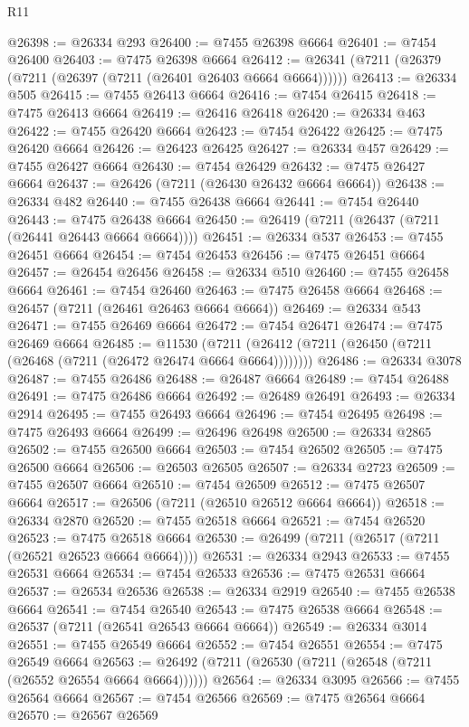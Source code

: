 \begin{lexlean}{R11}
\begin{coremodule}
{{{{{{{{{{{{{{{{{{{{{{{{{{{{{{{{{{{{{{{{{{{{{{{{{{{{{{{{{{{{{{{{{{{{{{{{{{{{{{{{{{@26398 := @26334 @293
@26400 := @7455 @26398 @6664
@26401 := @7454 @26400
@26403 := @7475 @26398 @6664
@26412 := @26341 (@7211 (@26379 (@7211 (@26397 (@7211 (@26401 @26403 @6664 @6664))))))
@26413 := @26334 @505
@26415 := @7455 @26413 @6664
@26416 := @7454 @26415
@26418 := @7475 @26413 @6664
@26419 := @26416 @26418
@26420 := @26334 @463
@26422 := @7455 @26420 @6664
@26423 := @7454 @26422
@26425 := @7475 @26420 @6664
@26426 := @26423 @26425
@26427 := @26334 @457
@26429 := @7455 @26427 @6664
@26430 := @7454 @26429
@26432 := @7475 @26427 @6664
@26437 := @26426 (@7211 (@26430 @26432 @6664 @6664))
@26438 := @26334 @482
@26440 := @7455 @26438 @6664
@26441 := @7454 @26440
@26443 := @7475 @26438 @6664
@26450 := @26419 (@7211 (@26437 (@7211 (@26441 @26443 @6664 @6664))))
@26451 := @26334 @537
@26453 := @7455 @26451 @6664
@26454 := @7454 @26453
@26456 := @7475 @26451 @6664
@26457 := @26454 @26456
@26458 := @26334 @510
@26460 := @7455 @26458 @6664
@26461 := @7454 @26460
@26463 := @7475 @26458 @6664
@26468 := @26457 (@7211 (@26461 @26463 @6664 @6664))
@26469 := @26334 @543
@26471 := @7455 @26469 @6664
@26472 := @7454 @26471
@26474 := @7475 @26469 @6664
@26485 := @11530
    (@7211 (@26412 (@7211 (@26450 (@7211 (@26468 (@7211 (@26472 @26474 @6664 @6664))))))))
@26486 := @26334 @3078
@26487 := @7455 @26486
@26488 := @26487 @6664
@26489 := @7454 @26488
@26491 := @7475 @26486 @6664
@26492 := @26489 @26491
@26493 := @26334 @2914
@26495 := @7455 @26493 @6664
@26496 := @7454 @26495
@26498 := @7475 @26493 @6664
@26499 := @26496 @26498
@26500 := @26334 @2865
@26502 := @7455 @26500 @6664
@26503 := @7454 @26502
@26505 := @7475 @26500 @6664
@26506 := @26503 @26505
@26507 := @26334 @2723
@26509 := @7455 @26507 @6664
@26510 := @7454 @26509
@26512 := @7475 @26507 @6664
@26517 := @26506 (@7211 (@26510 @26512 @6664 @6664))
@26518 := @26334 @2870
@26520 := @7455 @26518 @6664
@26521 := @7454 @26520
@26523 := @7475 @26518 @6664
@26530 := @26499 (@7211 (@26517 (@7211 (@26521 @26523 @6664 @6664))))
@26531 := @26334 @2943
@26533 := @7455 @26531 @6664
@26534 := @7454 @26533
@26536 := @7475 @26531 @6664
@26537 := @26534 @26536
@26538 := @26334 @2919
@26540 := @7455 @26538 @6664
@26541 := @7454 @26540
@26543 := @7475 @26538 @6664
@26548 := @26537 (@7211 (@26541 @26543 @6664 @6664))
@26549 := @26334 @3014
@26551 := @7455 @26549 @6664
@26552 := @7454 @26551
@26554 := @7475 @26549 @6664
@26563 := @26492 (@7211 (@26530 (@7211 (@26548 (@7211 (@26552 @26554 @6664 @6664))))))
@26564 := @26334 @3095
@26566 := @7455 @26564 @6664
@26567 := @7454 @26566
@26569 := @7475 @26564 @6664
@26570 := @26567 @26569
}}}}}}}}}}}}}}}}}}}}}}}}}}}}}}}}}}}}}}}}}}}}}}}}}}}}}}}}}}}}}}}}}}}}}}}}}}}}}}}}}}
\end{coremodule}
\end{lexlean}
